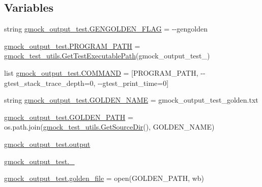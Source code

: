 \subsection*{Variables}
\begin{DoxyCompactItemize}
\item 
string \mbox{\hyperlink{namespacegmock__output__test_a0bd3131fe8262154217588fed6b28d45}{gmock\+\_\+output\+\_\+test.\+G\+E\+N\+G\+O\+L\+D\+E\+N\+\_\+\+F\+L\+AG}} = \textquotesingle{}-\/-\/gengolden\textquotesingle{}
\item 
\mbox{\hyperlink{namespacegmock__output__test_a03aac0fac952a0b3648340f529af7f59}{gmock\+\_\+output\+\_\+test.\+P\+R\+O\+G\+R\+A\+M\+\_\+\+P\+A\+TH}} = \mbox{\hyperlink{namespacegmock__test__utils_aadd2927024e24f0c53f7ba283402cdb1}{gmock\+\_\+test\+\_\+utils.\+Get\+Test\+Executable\+Path}}(\textquotesingle{}gmock\+\_\+output\+\_\+test\+\_\+\textquotesingle{})
\item 
list \mbox{\hyperlink{namespacegmock__output__test_a33f8ca97d99711e23517962ca4c729af}{gmock\+\_\+output\+\_\+test.\+C\+O\+M\+M\+A\+ND}} = \mbox{[}P\+R\+O\+G\+R\+A\+M\+\_\+\+P\+A\+TH, \textquotesingle{}-\/-\/gtest\+\_\+stack\+\_\+trace\+\_\+depth=0\textquotesingle{}, \textquotesingle{}-\/-\/gtest\+\_\+print\+\_\+time=0\textquotesingle{}\mbox{]}
\item 
string \mbox{\hyperlink{namespacegmock__output__test_ac6e9298ea3967e6fa704c9c246d6cc18}{gmock\+\_\+output\+\_\+test.\+G\+O\+L\+D\+E\+N\+\_\+\+N\+A\+ME}} = \textquotesingle{}gmock\+\_\+output\+\_\+test\+\_\+golden.\+txt\textquotesingle{}
\item 
\mbox{\hyperlink{namespacegmock__output__test_a632c0fbf08500e4ed3c0e33f5e2ac771}{gmock\+\_\+output\+\_\+test.\+G\+O\+L\+D\+E\+N\+\_\+\+P\+A\+TH}} = os.\+path.\+join(\mbox{\hyperlink{namespacegmock__test__utils_ab7217591e655e80392c9db6b99d04765}{gmock\+\_\+test\+\_\+utils.\+Get\+Source\+Dir}}(), G\+O\+L\+D\+E\+N\+\_\+\+N\+A\+ME)
\item 
\mbox{\hyperlink{namespacegmock__output__test_a4277f8598ba3835393fe82e82d09375d}{gmock\+\_\+output\+\_\+test.\+output}}
\item 
\mbox{\hyperlink{namespacegmock__output__test_acd6befb6031f17f78a4425c90b1f5b19}{gmock\+\_\+output\+\_\+test.\+\_\+}}
\item 
\mbox{\hyperlink{namespacegmock__output__test_aa592d26826a4dabf494fc2dd3c5c8b1e}{gmock\+\_\+output\+\_\+test.\+golden\+\_\+file}} = open(G\+O\+L\+D\+E\+N\+\_\+\+P\+A\+TH, \textquotesingle{}wb\textquotesingle{})
\end{DoxyCompactItemize}
